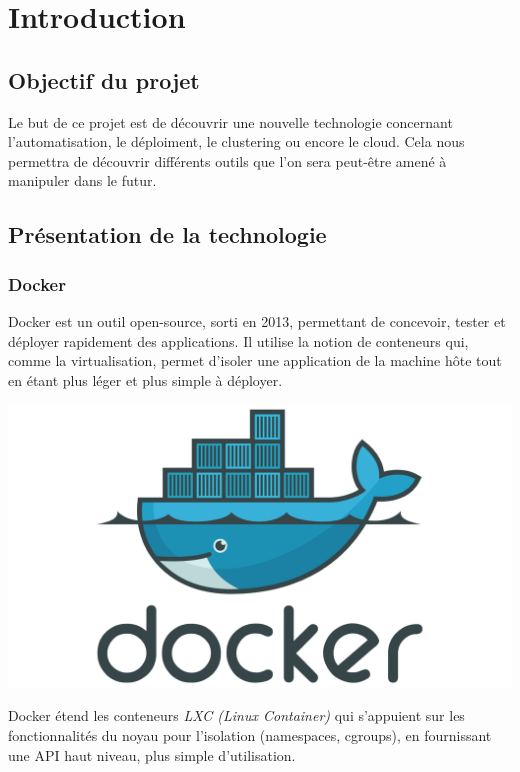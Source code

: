 \chapter{Introduction}

\section{Objectif du projet}

Le but de ce projet est de découvrir une nouvelle technologie concernant l'automatisation, le
déploiment, le clustering ou encore le cloud. Cela nous permettra de découvrir différents outils
que l'on sera peut-être amené à manipuler dans le futur.

\section{Présentation de la technologie}

\subsection{Docker}

\begin{paracol}{2}

Docker est un outil open-source, sorti en 2013, permettant de concevoir, tester et déployer
rapidement des applications. Il utilise la notion de conteneurs qui, comme la virtualisation,
permet d’isoler une application de la machine hôte tout en étant plus léger et plus simple à
déployer.

\switchcolumn

\includegraphics[width=0.7\linewidth]{img/docker}

\end{paracol}
\jmp

Docker étend les conteneurs \emph{LXC (Linux Container)} qui s’appuient sur les fonctionnalités du
noyau pour l’isolation (namespaces, cgroups), en fournissant une API haut niveau, plus simple
d’utilisation.\newline

